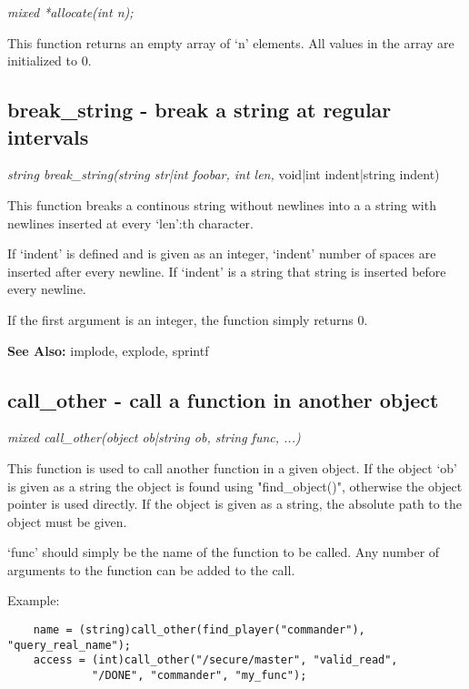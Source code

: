     {\em mixed *allocate(int n);}

    This function returns an empty array of `n' elements. All
    values in the array are initialized to 0.



\subsection{break\_string - break a string at regular intervals}
    
    {\em string break\_string(string str|int foobar, int len, }
                void|int indent|string indent)

    This function breaks a continous string without newlines into a
    a string with newlines inserted at every `len':th character. 

    If `indent' is defined and is given as an integer, `indent' number
    of spaces are inserted after every newline. If `indent' is a string 
    that string is inserted before every newline.

    If the first argument is an integer, the function simply returns 0.

    {\bf See Also: }    implode, explode, sprintf



\subsection{call\_other - call a function in another object}
    
    {\em mixed call\_other(object ob|string ob, string func, ...)}

    This function is used to call another function in a given
    object. If the object `ob' is given as a string the object
    is found using "find\_object()", otherwise the object pointer
    is used directly. If the object is given as a string, the
    absolute path to the object must be given.

    `func' should simply be the name of the function to be called.
    Any number of arguments to the function can be added to the
    call.

    Example:

    \begin{verbatim}
    name = (string)call_other(find_player("commander"), "query_real_name");
    access = (int)call_other("/secure/master", "valid_read",
             "/DONE", "commander", "my_func");
    \end{verbatim}

